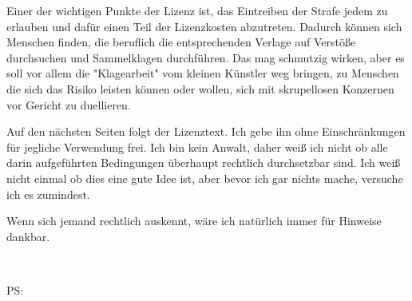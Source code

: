 \documentclass[a4paper,8pt]{extarticle}
\begin{document}
Einer der wichtigen Punkte der Lizenz ist, das Eintreiben der Strafe jedem zu erlauben und dafür einen Teil der Lizenzkosten abzutreten. Dadurch können sich Menschen finden, die beruflich die entsprechenden Verlage auf Verstöße durchsuchen und Sammelklagen durchführen. Das mag schmutzig wirken, aber es soll vor allem die "Klagearbeit" vom kleinen Künstler weg bringen, zu Menschen die sich das Risiko leisten können oder wollen, sich mit skrupellosen Konzernen vor Gericht zu duellieren.

Auf den nächsten Seiten folgt der Lizenztext. Ich gebe ihn ohne Einschränkungen für jegliche Verwendung frei. Ich bin kein Anwalt, daher weiß ich nicht ob alle darin aufgeführten Bedingungen überhaupt rechtlich durchsetzbar sind. Ich weiß nicht einmal ob dies eine gute Idee ist, aber bevor ich gar nichts mache, versuche ich es zumindest.

Wenn sich jemand rechtlich auskennt, wäre ich natürlich immer für Hinweise dankbar.

\ 

PS:
\end{document}
